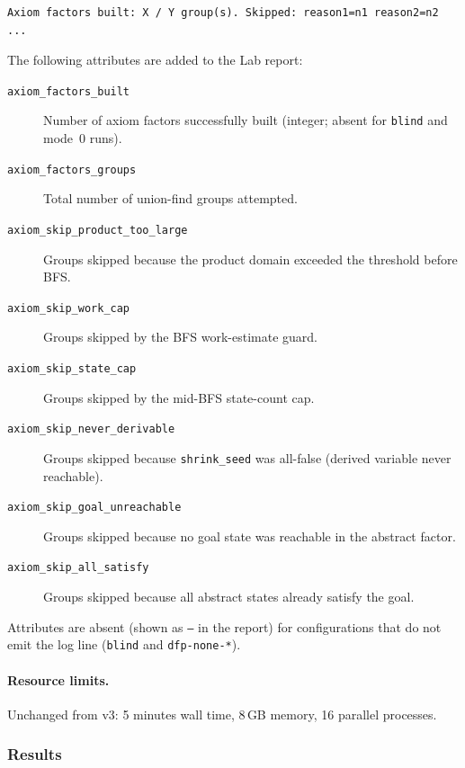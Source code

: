 \documentclass[11pt,a4paper]{article}
\begin{document}
\begin{verbatim}
Axiom factors built: X / Y group(s). Skipped: reason1=n1 reason2=n2 ...
\end{verbatim}

The following attributes are added to the Lab report:

\begin{description}
  \item[\texttt{axiom\_factors\_built}] Number of axiom factors successfully
        built (integer; absent for \texttt{blind} and mode~0 runs).
  \item[\texttt{axiom\_factors\_groups}] Total number of union-find groups
        attempted.
  \item[\texttt{axiom\_skip\_product\_too\_large}] Groups skipped because
        the product domain exceeded the threshold before BFS.
  \item[\texttt{axiom\_skip\_work\_cap}] Groups skipped by the BFS
        work-estimate guard.
  \item[\texttt{axiom\_skip\_state\_cap}] Groups skipped by the mid-BFS
        state-count cap.
  \item[\texttt{axiom\_skip\_never\_derivable}] Groups skipped because
        \texttt{shrink\_seed} was all-false (derived variable never
        reachable).
  \item[\texttt{axiom\_skip\_goal\_unreachable}] Groups skipped because no
        goal state was reachable in the abstract factor.
  \item[\texttt{axiom\_skip\_all\_satisfy}] Groups skipped because all
        abstract states already satisfy the goal.
\end{description}

Attributes are absent (shown as \texttt{---} in the report) for configurations
that do not emit the log line (\texttt{blind} and \texttt{dfp-none-*}).

\paragraph{Resource limits.}
Unchanged from v3: 5 minutes wall time, 8\,GB memory, 16 parallel processes.

\subsubsection*{Results}
\label{sec:v4-results}
\end{document}
